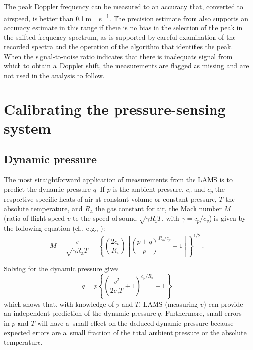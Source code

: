 \documentclass[amtd, online, hvmath]{copernicus}
\begin{document}
The peak Doppler frequency can be measured to an accuracy that,
converted to airspeed, is better than 0.1\,\unit{m\,s^{-1}}. The
precision estimate from \citet{SpulerEtAl2011} also supports an
accuracy estimate in this range if there is no bias in the selection
of the peak in the shifted frequency spectrum, as is supported by
careful examination of the recorded spectra and the operation of the
algorithm that identifies the peak.  When the signal-to-noise ratio
indicates that there is inadequate signal from which to obtain
a~Doppler shift, the measurements are flagged as missing and are not
used in the analysis to follow.

\section{Calibrating the pressure-sensing system}

\subsection{Dynamic pressure}

The most straightforward application of measurements from the LAMS is
to predict the dynamic pressure $q$. If $p$ is the ambient pressure,
$c_v$ and $c_p$ the respective specific heats of air at constant
volume or constant pressure, $T$ the absolute temperature, and
$R_{\mathrm{a}}$ the gas constant for air, the Mach number $M$ (ratio
of flight speed $v$ to the speed of sound $\sqrt{\gamma
  R_{\mathrm{a}}T}$, with $\gamma=c_p/c_v$)
is given by the following equation (cf., e.g., \citealp{NCAR_OpenSky_TECH-NOTE-000-000-000-064}):
\begin{equation}
  M=\frac{v}{\sqrt{\gamma
      R_{\mathrm{a}}T}}=\left\{\left(\frac{2c_v}{R_{\mathrm{a}}}\right)\left[\left(\frac{p+q}{p}\right)^{R_{\mathrm{a}}/c_p}-1\right]\right\}
    ^{1/2}\,.\label{eq:MachEq-1}
\end{equation}

Solving for the dynamic pressure gives
\begin{equation}
q=p\left\{\left(\frac{v^2}{2c_pT}+1\right)^{c_p/R_{\mathrm{a}}}-1\right\} \label{eq:qFromLAMS-1}
\end{equation}
which shows that, with knowledge of $p$ and $T$, LAMS (measuring $v$)
can provide an independent prediction of the dynamic pressure
$q$. Furthermore, small errors in $p$ and $T$ will have a~small effect
on the deduced dynamic pressure because expected errors are a~small
fraction of the total ambient pressure or the absolute temperature.
\end{document}
